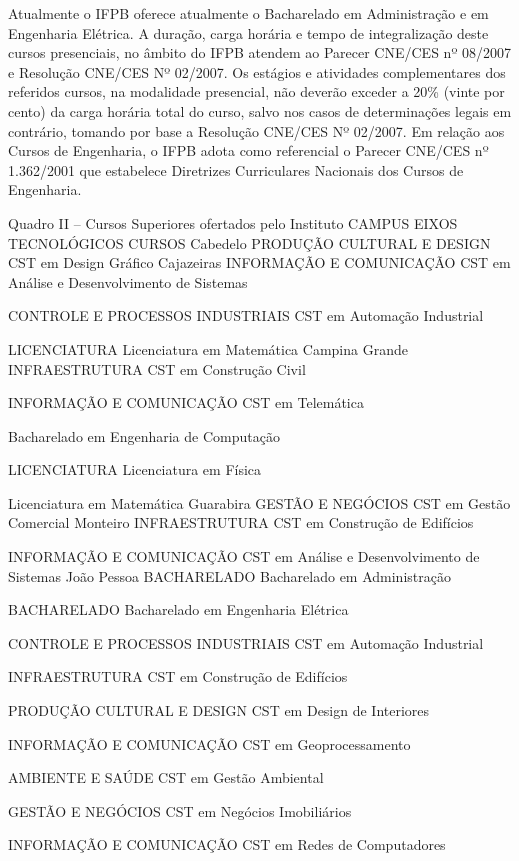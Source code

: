 	Atualmente o IFPB oferece atualmente o Bacharelado em Administração e em Engenharia Elétrica. A duração, carga horária e tempo de integralização deste cursos presenciais, no âmbito do IFPB atendem ao Parecer CNE/CES nº 08/2007 e Resolução CNE/CES Nº 02/2007. Os estágios e atividades complementares dos referidos cursos, na modalidade presencial, não deverão exceder a 20\% (vinte por cento) da carga horária total do curso, salvo nos casos de determinações legais em contrário, tomando por base a Resolução CNE/CES Nº 02/2007. Em relação aos Cursos de Engenharia, o IFPB adota como referencial o Parecer CNE/CES nº 1.362/2001 que estabelece Diretrizes Curriculares Nacionais dos Cursos de Engenharia.

Quadro II – Cursos Superiores ofertados pelo Instituto
CAMPUS
EIXOS TECNOLÓGICOS
CURSOS
Cabedelo
PRODUÇÃO CULTURAL E DESIGN
CST em Design Gráfico
Cajazeiras
INFORMAÇÃO E COMUNICAÇÃO
CST em Análise e Desenvolvimento de Sistemas

CONTROLE E PROCESSOS INDUSTRIAIS
CST em Automação Industrial

LICENCIATURA
Licenciatura em Matemática
Campina Grande
INFRAESTRUTURA
CST em Construção Civil

INFORMAÇÃO E COMUNICAÇÃO
CST em Telemática


Bacharelado em Engenharia de Computação

LICENCIATURA
Licenciatura em Física



Licenciatura em Matemática
Guarabira
GESTÃO E NEGÓCIOS
CST em Gestão Comercial
Monteiro
INFRAESTRUTURA
CST em Construção de Edifícios

INFORMAÇÃO E COMUNICAÇÃO
CST em Análise e Desenvolvimento de Sistemas
João Pessoa
BACHARELADO
Bacharelado em Administração

BACHARELADO
Bacharelado em Engenharia Elétrica

CONTROLE E PROCESSOS INDUSTRIAIS
CST em Automação Industrial

INFRAESTRUTURA
CST em Construção de Edifícios

PRODUÇÃO CULTURAL E DESIGN
CST em Design de Interiores

INFORMAÇÃO E COMUNICAÇÃO
CST em Geoprocessamento

AMBIENTE E SAÚDE
CST em Gestão Ambiental

GESTÃO E NEGÓCIOS
CST em Negócios Imobiliários

INFORMAÇÃO E COMUNICAÇÃO
CST em Redes de Computadores


